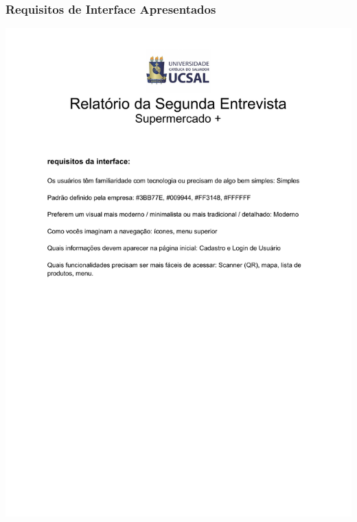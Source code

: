 \documentclass[12pt,oneside,a4paper,article]{abntex2}
\begin{document}
    \subsubsection{Requisitos de Interface Apresentados}
    \includegraphics[page=1, width=\textwidth]{imagens-template/arquivos/segunda entrevista.pdf}
    
    \newpage
\end{document}
